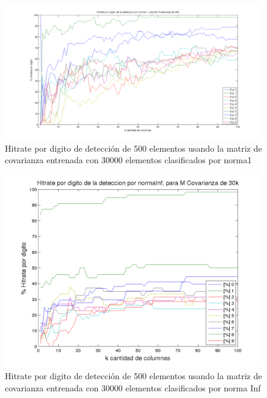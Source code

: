 \begin{figure}[H]
\begin {center}
\includegraphics[width=\pdwidth]{plots/pordig-30kcv-norma1.png}
\end {center}
\caption{Hitrate por digito de detecci\'on de 500 elementos usando la matriz de covarianza entrenada con 30000 elementos
clasificados por norma1}
\label{fig:HRD30kcv-n1}
\end{figure}

\begin{figure}[H]
\begin {center}
\includegraphics[width=\pdwidth]{plots/pordig-30kcv-normaInf.png}
\end {center}
\caption{Hitrate por digito de detecci\'on de 500 elementos usando la matriz de covarianza entrenada con 30000 elementos
clasificados por norma Inf}
\label{fig:HRD30kcv-ninf}
\end{figure}

